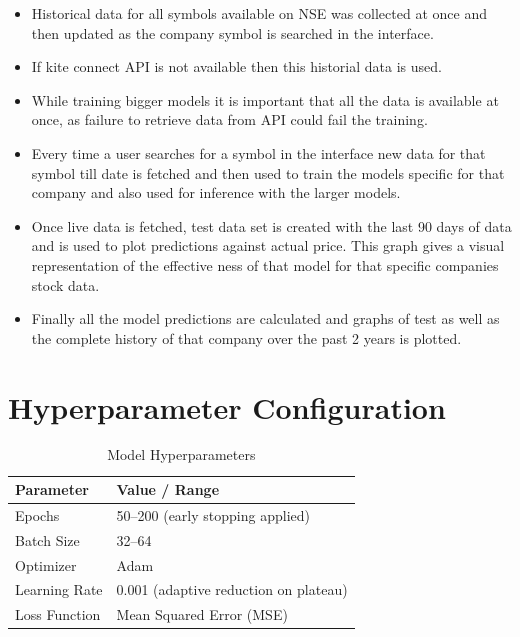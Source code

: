\begin{itemize}
    \item Historical data for all symbols available on NSE was collected at once and then updated as the company symbol is searched in the interface.
    \item If kite connect API is not available then this historial data is used.
    \item While training bigger models it is important that all the data is available at once, as failure to retrieve data from API could fail the training.
    \item Every time a user searches for a symbol in the interface new data for that symbol till date is fetched and then used to train the models specific for that company and also used for inference with the larger models.
    \item Once live data is fetched, test data set is created with the last 90 days of data and is used to plot predictions against actual price. This graph gives a visual representation of the effective ness of that model for that specific companies stock data.
    \item Finally all the model predictions are calculated and graphs of test as well as the complete history of that company over the past 2 years is plotted.
\end{itemize}

\section{Hyperparameter Configuration}

\begin{table}[h!]
    \centering
    \caption{Model Hyperparameters}
    \label{tab:hyperparameters}
    \begin{tabular}{|l|l|}
        \hline
        \textbf{Parameter} & \textbf{Value / Range} \\
        \hline
        Epochs & 50--200 (early stopping applied) \\
        \hline
        Batch Size & 32--64 \\
        \hline
        Optimizer & Adam \\
        \hline
        Learning Rate & 0.001 (adaptive reduction on plateau) \\
        \hline
        Loss Function & Mean Squared Error (MSE) \\
        \hline
    \end{tabular}
\end{table}


